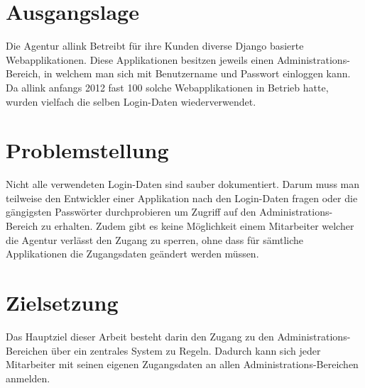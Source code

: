 \section{Ausgangslage}
\label{sec:EinleitungAusgangslage}
Die Agentur allink Betreibt für ihre Kunden diverse Django basierte Webapplikationen. Diese Applikationen besitzen jeweils einen Administrations-Bereich, in welchem man sich mit Benutzername und Passwort einloggen kann. Da allink anfangs 2012 fast 100 solche Webapplikationen in Betrieb hatte, wurden vielfach die selben Login-Daten wiederverwendet.

\section{Problemstellung}
\label{sec:Problemstellung}
Nicht alle verwendeten Login-Daten sind sauber dokumentiert. Darum muss man teilweise den Entwickler einer Applikation nach den Login-Daten fragen oder die gängigsten Passwörter durchprobieren um Zugriff auf den Administrations-Bereich zu erhalten. Zudem gibt es keine Möglichkeit einem Mitarbeiter welcher die Agentur verlässt den Zugang zu sperren, ohne dass für sämtliche Applikationen die Zugangsdaten geändert werden müssen.

\section{Zielsetzung}
\label{sec:Zielsetzung}
Das Hauptziel dieser Arbeit besteht darin den Zugang zu den Administrations-Bereichen über ein zentrales System zu Regeln. Dadurch kann sich jeder Mitarbeiter mit seinen eigenen Zugangsdaten an allen Administrations-Bereichen anmelden.
